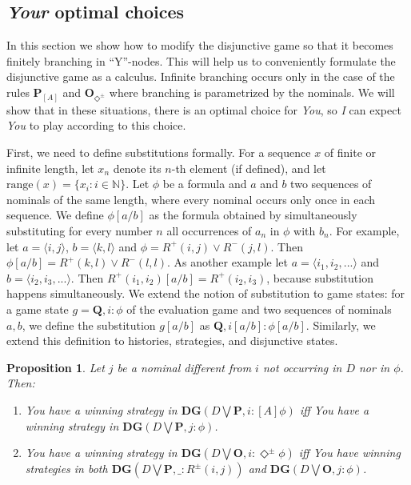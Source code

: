 \documentclass{easychair}
\newcommand{\I}{\emph{I}\xspace}
\newcommand{\You}{\emph{You}\xspace}
\newcommand{\Your}{\emph{Your}\xspace}
\newtheorem{proposition}{Proposition}
\newcommand{\bfP}{\mathbf{P}}
\newcommand{\bfO}{\mathbf{O}}
\begin{document}
\subsection{\Your optimal choices\label{sect:opt}}
In this section we show how to modify the disjunctive game so that it becomes
finitely branching in ``Y''-nodes. This  will help us to conveniently
formulate the disjunctive game as a calculus. Infinite branching occurs only in
the case of the rules $\bfP_{[A]}$ and $\bfO_{\Diamond^\pm}$ where branching is
parametrized by the nominals. We will show that in these situations, there is
an optimal choice for \You, so \I can expect \You to play according to this
choice.

First, we need to define substitutions formally. For a sequence $x$ of finite or infinite length, let $x_n$ denote its $n$-th element (if defined),  and let $\mathrm{range}(x)=\{x_i:i\in \mathbb{N}\}$. Let $\phi$ be a formula and $a$ and $b$ two sequences of nominals of the same length, where every nominal occurs only once in each sequence. We define 
$\phi[a/b]$ as the formula obtained by simultaneously substituting for every number $n$ all occurrences of $a_n$ in $\phi$ with $b_n$. For example, let $a = \langle i, j \rangle$, $b = \langle k, l \rangle$ and $\phi = R^+(i,j) \vee R^-(j,l)$. Then $\phi[a/b] = R^+(k,l)\vee R^-(l,l)$.  As another example let $a = \langle i_1, i_2, ... \rangle$ and $b = \langle i_2, i_3, ... \rangle$. Then $R^+(i_1,i_2)[a/b] = R^+(i_2,i_3)$, because substitution happens simultaneously. We extend the notion of substitution to game states: for a game state $g=\mathbf{Q}, i: \phi$ of the evaluation game and two sequences of nominals $a,b$, we define the substitution $g[a/b]$ as $\mathbf{Q}, i[a/b]:\phi[a/b]$. Similarly, we extend this definition to histories, strategies, and disjunctive states. 

\begin{proposition}\label{prop:bestchoice}
    Let $j$  be a nominal different from $i$ not occurring in $D$ nor in $\phi$. Then:
\begin{enumerate}
    \item \You have a winning strategy in $\mathbf{DG}(D \bigvee \mathbf{P},i: [A]\phi)$ iff \You have a winning strategy in $\mathbf{DG}(D \bigvee \mathbf{P},j: \phi)$.
    \item \You have a winning strategy in $\mathbf{DG}(D \bigvee \mathbf{O},i:\Diamond^\pm \phi)$ iff \You have winning strategies in both $\mathbf{DG}(D \bigvee \mathbf{P},\_: R^\pm(i,j))$ and $\mathbf{DG}(D \bigvee \mathbf{O},j:\phi)$.
\end{enumerate}
\end{proposition}
\end{document}
